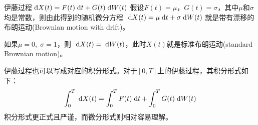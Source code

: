 \documentclass[t]{beamer}
\newcommand{\dif}{{\;\rm d}}
\begin{document}
\begin{frame}{伊藤过程$\dif X(t)=F(t)\dif t+G(t)\dif W(t)$}
假设$F(t)=\mu$，$G(t)=\sigma$，其中$\mu$和$\sigma$均是常数，则由此得到的随机微分方程
$\dif X(t)=\mu\dif t+\sigma\dif W(t)$
就是带有漂移的布朗运动(Brownian motion with drift)。

如果$\mu=0,\; \sigma=1$，则
$\dif X(t)=\dif W(t)$，此时$X(t)$就是标准布朗运动(standard Brownian motion)。

伊藤过程也可以写成对应的积分形式。对于$[0,T]$上的伊藤过程，其积分形式如下：
\begin{equation*}
\int^T_0 \dif X(t)=\int^T_0 F(t)\dif t+\int^T_0 G(t)\dif W(t)
\end{equation*}
{\color{red}积分形式更正式且严谨，而微分形式则相对容易理解。}
\end{frame}
\end{document}
